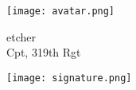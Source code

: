 \vfil%


\begin{flushright}
    \hfill \parbox{0.3\textwidth}{\raggedright \hfill \texttt{[image: avatar.png]}} \hfil \parbox{0.4\textwidth}{\raggedright etcher \\ Cpt, 319th Rgt \\ \inmem{}}%

\hfill \parbox{0.3\textwidth}{\raggedright \hfill } \hfil \parbox{0.4\textwidth}%
{\centering \texttt{[image: signature.png]}}%
\end{flushright}%

\vfil%
